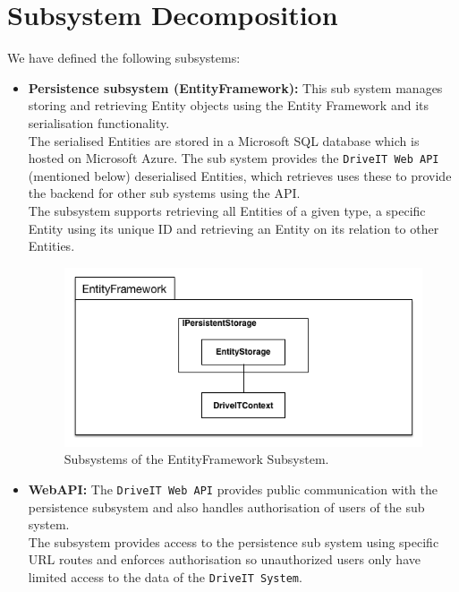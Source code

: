 \section{Subsystem Decomposition}
We have defined the following subsystems:
\begin{itemize}
	\item \textbf{Persistence subsystem (EntityFramework):} This sub system manages storing and retrieving Entity objects using the Entity Framework and its serialisation functionality.\\
	The serialised Entities are stored in a Microsoft SQL database which is hosted on Microsoft Azure. The sub system provides the \texttt{DriveIT Web API} (mentioned below) deserialised Entities, which retrieves uses these to provide the backend for other sub systems using the API.\\
	The subsystem supports retrieving all Entities of a given type, a specific Entity using its unique ID and retrieving an Entity on its relation to other Entities. 
	\begin{figure}[H]
		\centering
		\includegraphics[scale=0.30]{Figures/EntityFrameworkSubsystemDecomposition}
		\caption{Subsystems of the EntityFramework Subsystem.}
	\end{figure}
	\item \textbf{WebAPI:} The \texttt{DriveIT Web API} provides public communication with the persistence subsystem and also handles authorisation of users of the sub system.\\
	The subsystem provides access to the persistence sub system using specific URL routes and enforces authorisation so unauthorized users only have limited access to the data of the \texttt{DriveIT System}.\\ 

\end{itemize}
